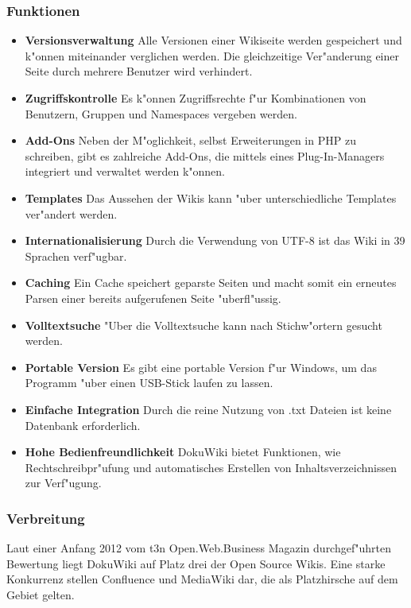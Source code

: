 \subsubsection*{Funktionen}
\begin{itemize}
\item \textbf{Versionsverwaltung}
Alle Versionen einer Wikiseite werden gespeichert und k"onnen miteinander verglichen werden. Die gleichzeitige Ver"anderung einer Seite durch mehrere Benutzer wird verhindert.
\item \textbf{Zugriffskontrolle}
Es k"onnen Zugriffsrechte f"ur Kombinationen von Benutzern, Gruppen und Namespaces vergeben werden.
\item \textbf{Add-Ons}
Neben der M"oglichkeit, selbst Erweiterungen in PHP zu schreiben, gibt es zahlreiche Add-Ons, die mittels eines Plug-In-Managers integriert und verwaltet werden k"onnen.
\item \textbf{Templates}
Das Aussehen der Wikis kann "uber unterschiedliche Templates ver"andert werden.
\item \textbf{Internationalisierung}
Durch die Verwendung von UTF-8 ist das Wiki in 39 Sprachen verf"ugbar.
\item \textbf{Caching}
Ein Cache speichert geparste Seiten und macht somit ein erneutes Parsen einer bereits aufgerufenen Seite "uberfl"ussig.
\item \textbf{Volltextsuche}
"Uber die Volltextsuche kann nach Stichw"ortern gesucht werden.
\item \textbf{Portable Version}
Es gibt eine portable Version f"ur Windows, um das Programm "uber einen USB-Stick laufen zu lassen.
\item \textbf{Einfache Integration}
Durch die reine Nutzung von .txt Dateien ist keine Datenbank erforderlich.
\item \textbf{Hohe Bedienfreundlichkeit}
DokuWiki bietet Funktionen, wie Rechtschreibpr"ufung und automatisches Erstellen von Inhaltsverzeichnissen zur Verf"ugung. 
\end{itemize}

\subsubsection*{Verbreitung}
Laut einer Anfang 2012 vom t3n Open.Web.Business Magazin durchgef"uhrten Bewertung liegt DokuWiki auf Platz drei der Open Source Wikis. Eine starke Konkurrenz stellen Confluence und MediaWiki dar, die als Platzhirsche auf dem Gebiet gelten.
